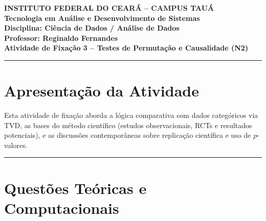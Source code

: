 \documentclass[12pt]{article}
\begin{document}
\begin{center}
    \vspace{0.5cm}
    \textbf{INSTITUTO FEDERAL DO CEARÁ -- CAMPUS TAUÁ} \\
    \textbf{Tecnologia em Análise e Desenvolvimento de Sistemas} \\
    \textbf{Disciplina: Ciência de Dados / Análise de Dados} \\
    \textbf{Professor: Reginaldo Fernandes} \\
    \vspace{0.5cm}
    \large{\textbf{Atividade de Fixação 3 -- Testes de Permutação e Causalidade (N2)}}
    \vspace{0.3cm}
\end{center}

\hrule
\vspace{0.4cm}

\section*{Apresentação da Atividade}
Esta atividade de fixação aborda a lógica comparativa com dados categóricos via TVD, as bases do método científico (estudos observacionais, RCTs e resultados potenciais), e as discussões contemporâneas sobre replicação científica e uso de $p$-valores.

\vspace{0.3cm}
\hrule
\vspace{0.5cm}

\section*{Questões Teóricas e Computacionais}
\end{document}
